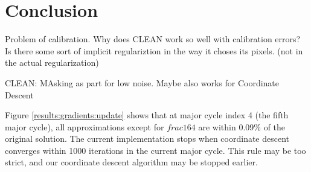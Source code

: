 \section{Conclusion}

Problem of calibration.
Why does CLEAN work so well with calibration errors? Is there some sort of implicit regulariztion in the way it choses its pixels. (not in the actual regularization)

CLEAN: MAsking as part for low noise. Maybe also works for Coordinate Descent

Figure \ref{results:gradients:update} shows that at major cycle index 4 (the fifth major cycle), all approximations except for $frac{1}{64}$ are within 0.09\% of the original solution. The current implementation stops when coordinate descent converges within 1000 iterations in the current major cycle. This rule may be too strict, and our coordinate descent algorithm may be stopped earlier. 